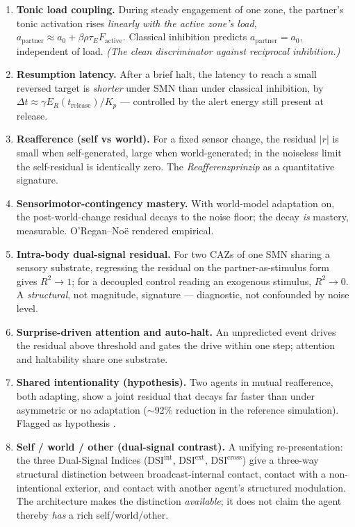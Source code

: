 \documentclass[utf8]{FrontiersinHarvard} %
\begin{document}
\begin{enumerate}
\item \textbf{Tonic load coupling.} During steady engagement of one zone, the partner's tonic activation rises \emph{linearly with the active zone's load}, $a_{\text{partner}}\approx a_0+\beta\rho\tau_E F_{\text{active}}$. Classical inhibition predicts $a_{\text{partner}}=a_0$, independent of load. \emph{(The clean discriminator against reciprocal inhibition.)}
\item \textbf{Resumption latency.} After a brief halt, the latency to reach a small reversed target is \emph{shorter} under SMN than under classical inhibition, by $\Delta t\approx \gamma E_R(t_{\text{release}})/K_p$ --- controlled by the alert energy still present at release.
\item \textbf{Reafference (self vs world).} For a fixed sensor change, the residual $|r|$ is small when self-generated, large when world-generated; in the noiseless limit the self-residual is identically zero. The \emph{Reafferenzprinzip} as a quantitative signature.
\item \textbf{Sensorimotor-contingency mastery.} With world-model adaptation on, the post-world-change residual decays to the noise floor; the decay \emph{is} mastery, measurable. O'Regan--No\"e rendered empirical.
\item \textbf{Intra-body dual-signal residual.} For two CAZs of one SMN sharing a sensory substrate, regressing the residual on the partner-as-stimulus form gives $R^2\to 1$; for a decoupled control reading an exogenous stimulus, $R^2\to 0$. A \emph{structural}, not magnitude, signature --- diagnostic, not confounded by noise level.
\item \textbf{Surprise-driven attention and auto-halt.} An unpredicted event drives the residual above threshold and gates the drive within one step; attention and haltability share one substrate.
\item \textbf{Shared intentionality (hypothesis).} Two agents in mutual reafference, both adapting, show a joint residual that decays far faster than under asymmetric or no adaptation ($\sim$92\% reduction in the reference simulation). Flagged as hypothesis \citep{Tomasello2005Understanding}.
\item \textbf{Self / world / other (dual-signal contrast).} A unifying re-presentation: the three Dual-Signal Indices ($\mathrm{DSI}^{\text{int}}$, $\mathrm{DSI}^{\text{ext}}$, $\mathrm{DSI}^{\text{cross}}$) give a three-way structural distinction between broadcast-internal contact, contact with a non-intentional exterior, and contact with another agent's structured modulation. The architecture makes the distinction \emph{available}; it does not claim the agent thereby \emph{has} a rich self/world/other.
\end{enumerate}
\end{document}
